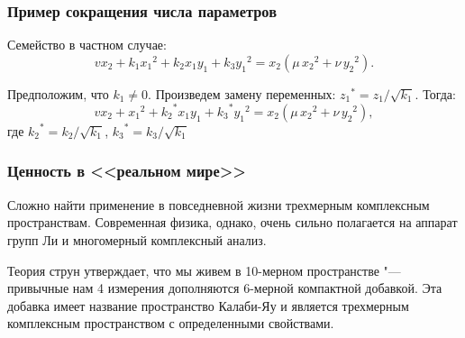 \documentclass[russian,hyperref={unicode}]{beamer}
\newcommand{\backupend}{
   \setcounter{framenumber}{\value{finalframe}}
}
\begin{document}
\frame
{
	\frametitle{Пример сокращения числа параметров}
	Семейство в частном случае:
	$$
	v x_2 + k_1 {x_1}^2 + k_2 x_1 y_1 + k_3 {y_1}^2 = x_2 (\mu\,{x_2}^2 + \nu\,{y_2}^2).
	$$
	
	Предположим, что $k_1 \ne 0$. Произведем замену переменных: ${z_1}^* = z_1 / \sqrt{k_1}$. Тогда:
		$$
	v x_2 + {x_1}^2 + {k_2}^* x_1 y_1 + {k_3}^* {y_1}^2 = x_2 (\mu\,{x_2}^2 + \nu\,{y_2}^2),
	$$
	где ${k_2}^* = k_2 / \sqrt{k_1}$, ${k_3}^* = k_3 / \sqrt{k_1}$
}
\frame
{
	\frametitle{Ценность в <<реальном мире>>}
	Сложно найти применение в повседневной жизни трехмерным комплексным пространствам. Современная физика, однако, очень сильно полагается на аппарат групп Ли и многомерный комплексный анализ.
	
	Теория струн утверждает, что мы живем в 10-мерном пространстве "--- привычные нам 4 измерения дополняются 6-мерной компактной добавкой. Эта добавка имеет название пространство Калаби-Яу и является трехмерным комплексным пространством с определенными свойствами. 	
}
\backupend
\end{document}
